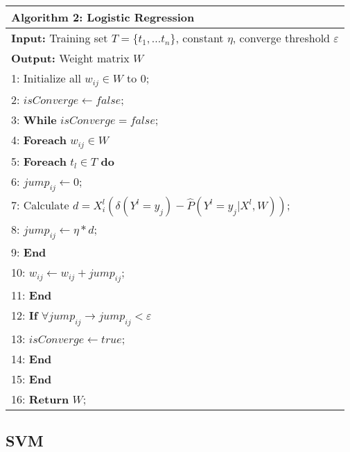 \renewcommand{\arraystretch}{1}
\vspace{-0.02in}
\begin{table}[htb]
\centering
\small
\begin{tabular}{l} \hline
\textbf{Algorithm 2:} Logistic Regression\\ \hline
\textbf{Input:} Training set $T=\{t_1,...t_n\}$, constant $\eta$, converge threshold $\varepsilon$\\
\textbf{Output:} Weight matrix $W$\\

\hspace{.15cm}1: Initialize all $w_{ij} \in W$ to 0;\\
\hspace{.15cm}2: $isConverge \leftarrow false$;\\
\hspace{.15cm}3: \textbf{While} $isConverge = false$;\\
\hspace{.15cm}4: \quad \textbf{Foreach} $w_{ij} \in W$\\
\hspace{.15cm}5: \quad \quad \textbf{Foreach} $t_l \in T$ \textbf{do} \\
\hspace{.15cm}6: \quad \quad \quad $jump_{ij} \leftarrow 0$;\\
\hspace{.15cm}7: \quad \quad \quad Calculate $d=X_{i}^{l}(\delta (Y^{l}=y_{j})-\hat{P}(Y^{l}=y_{j}|X^{l},W))$;\\
\hspace{.15cm}8: \quad \quad \quad $jump_{ij} \leftarrow \eta * d$; \\
\hspace{.15cm}9: \quad \quad \textbf{End}\\
10: \quad \quad $w_{ij} \leftarrow w_{ij} + jump_{ij}$;\\
11: \quad \textbf{End}\\
12: \quad \textbf{If} $\forall jump_{ij} \rightarrow jump_{ij} < \varepsilon$\\
13: \quad \quad $isConverge \leftarrow true$;\\
14: \quad \textbf{End}\\
15: \textbf{End}\\
16: \textbf{Return} $W$;\\
\hline
\end{tabular}
\normalsize
\end{table}

\subsection{SVM}
